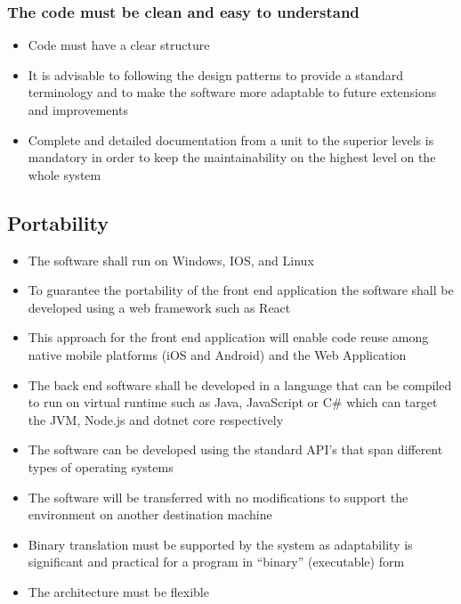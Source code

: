 \subsubsection{The code must be clean and easy to understand}
\begin{itemize}
  \item Code must have a clear structure
  \item It is advisable to following the design patterns to provide a standard terminology and to make the software more adaptable to future extensions and improvements
  \item Complete and detailed documentation from a unit to the superior levels is mandatory in order to keep the maintainability on the highest level on the whole system
\end{itemize}

\subsection{Portability}
\begin{itemize}
  \item The software shall run on Windows, IOS, and Linux
  \item To guarantee the portability of the front end application the software shall be developed using a web framework such as React
  \item This approach for the front end application will enable code reuse among native mobile platforms (iOS and Android) and the Web Application
  \item The back end software shall be developed in a language that can be compiled to run on virtual runtime such as Java, JavaScript or C\# which can target the JVM, Node.js and dotnet core respectively
  \item The software can be developed using the standard API’s that span different types of operating systems
  \item The software will be transferred with no modifications to support the environment on another destination machine
  \item Binary translation must be supported by the system as adaptability is significant and practical for a program in “binary” (executable) form
  \item The architecture must be flexible
\end{itemize}
